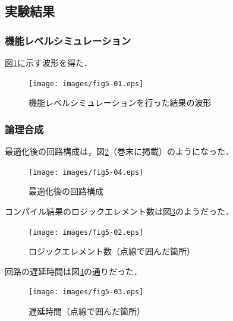 \documentclass[uplatex]{jsarticle}
\begin{document}
\subsection{実験結果}

\subsubsection{機能レベルシミュレーション}

図\ref{fig:5-01}に示す波形を得た．

\begin{figure}[htb]
  \begin{center}
    \texttt{[image: images/fig5-01.eps]}
    \caption{機能レベルシミュレーションを行った結果の波形}
    \label{fig:5-01}
  \end{center}
\end{figure}

\subsubsection{論理合成}

最適化後の回路構成は，図\ref{fig:5-04}（巻末に掲載）のようになった．

\begin{figure}[htb]
  \begin{center}
    \texttt{[image: images/fig5-04.eps]}
    \caption{最適化後の回路構成}
    \label{fig:5-04}
  \end{center}
\end{figure}

コンパイル結果のロジックエレメント数は図\ref{fig:5-02}のようだった． 

\begin{figure}[htb]
  \begin{center}
    \texttt{[image: images/fig5-02.eps]}
    \caption{ロジックエレメント数（点線で囲んだ箇所）}
    \label{fig:5-02}
  \end{center}
\end{figure}

回路の遅延時間は図\ref{fig:5-03}の通りだった．

\begin{figure}[htb]
  \begin{center}
    \texttt{[image: images/fig5-03.eps]}
    \caption{遅延時間（点線で囲んだ箇所）}
    \label{fig:5-03}
  \end{center}
\end{figure}
\end{document}

